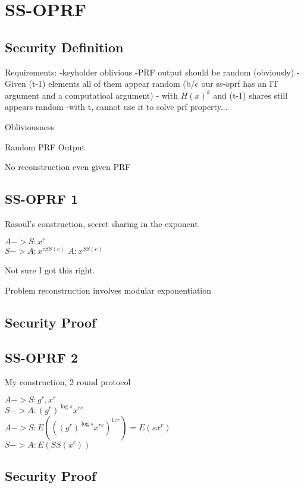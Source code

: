 \documentclass[10pt, sigconf]{acmart}
\begin{document}
\pagebreak


\section{SS-OPRF}

\subsection{Security Definition}


Requirements: 
-keyholder oblivious
-PRF output should be random (obviously)
- Given (t-1) elements all of them appear random (b/c our ss-oprf has an IT argument and a computatioal argument)
- with $H(x)^k$ and (t-1) shares still appears random 
-with t, cannot use it to solve prf property...


Obliviousness

Random PRF Output

No reconstruction even given PRF

\subsection{SS-OPRF 1}

Rasoul's construction, secret sharing in the exponent

$A -> S: x^r$ \\
$S -> A: x^{rSS(c)}$
$A: x^{SS(c)}$

Not sure I got this right.

Problem reconstruction involves modular exponentiation

\subsection{Security Proof}

\subsection{SS-OPRF 2}

My construction, 2 round protocol

$A -> S: g^r, x^r$ \\
$S -> A: (g^r)^{\log s} x^{rc}$ \\
$A -> S: E(((g^r)^{\log s} x^{rc})^{1/r}) = E(s x^c)$ \\
$S -> A: E(SS(x^c))$

\subsection{Security Proof}
\end{document}
